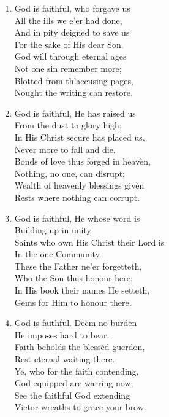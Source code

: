 \begin{enumerate}
    \item God is faithful, who forgave us \\
        All the ills we e'er had done, \\
        And in pity deigned to save us \\
        For the sake of His dear Son. \\
        God will through eternal ages \\
        Not one sin remember more; \\
        Blotted from th'accusing pages, \\
        Nought the writing can restore.

    \item God is faithful, He has raised us \\
        From the dust to glory high; \\
        In His Christ secure has placed us, \\
        Never more to fall and die. \\
        Bonds of love thus forged in heav\`en, \\
        Nothing, no one, can disrupt; \\
        Wealth of heavenly blessings giv\`en \\
        Rests where nothing can corrupt.

    \item God is faithful, He whose word is \\
        Building up in unity \\
        Saints who own His Christ their Lord is \\
        In the one Community. \\
        These the Father ne'er forgetteth, \\
        Who the Son thus honour here; \\
        In His book their names He setteth, \\
        Gems for Him to honour there.

    \item God is faithful. Deem no burden \\
        He imposes hard to bear. \\
        Faith beholds the bless\`ed guerdon, \\
        Rest eternal waiting there. \\
        Ye, who for the faith contending, \\
        God-equipped are warring now, \\
        See the faithful God extending \\
        Victor-wreaths to grace your brow.


\end{enumerate}
